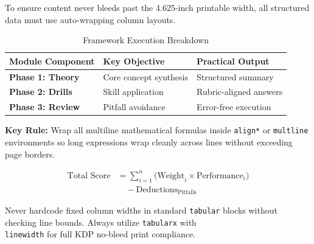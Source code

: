 \documentclass[10pt,twoside,openright]{book}
\begin{document}
To ensure content never bleeds past the 4.625-inch printable width, all structured data must use auto-wrapping column layouts.

\begin{table}[h!]
\small
\centering
\begin{tabularx}{\linewidth}{|>{\bfseries}p{1.1in}|Y|Y|}
\hline
Module Component & Key Objective & Practical Output \\ \hline
Phase 1: Theory & Core concept synthesis & Structured summary \\ \hline
Phase 2: Drills & Skill application & Rubric-aligned answers \\ \hline
Phase 3: Review & Pitfall avoidance & Error-free execution \\ \hline
\end{tabularx}
\caption{Framework Execution Breakdown}
\end{table}

\begin{conceptbox}
\textbf{Key Rule:} Wrap all multiline mathematical formulas inside \texttt{align*} or \texttt{multline} environments so long expressions wrap cleanly across lines without exceeding page borders.
\end{conceptbox}

\begin{align*}
\text{Total Score} &= \sum_{i=1}^{n} \Big( \text{Weight}_i \times \text{Performance}_i \Big) \\
                   &\quad - \text{Deductions}_{\text{Pitfalls}}
\end{align*}

\begin{warningbox}
Never hardcode fixed column widths in standard \texttt{tabular} blocks without checking line bounds. Always utilize \texttt{tabularx} with \texttt{\\linewidth} for full KDP no-bleed print compliance.
\end{warningbox}
\end{document}
